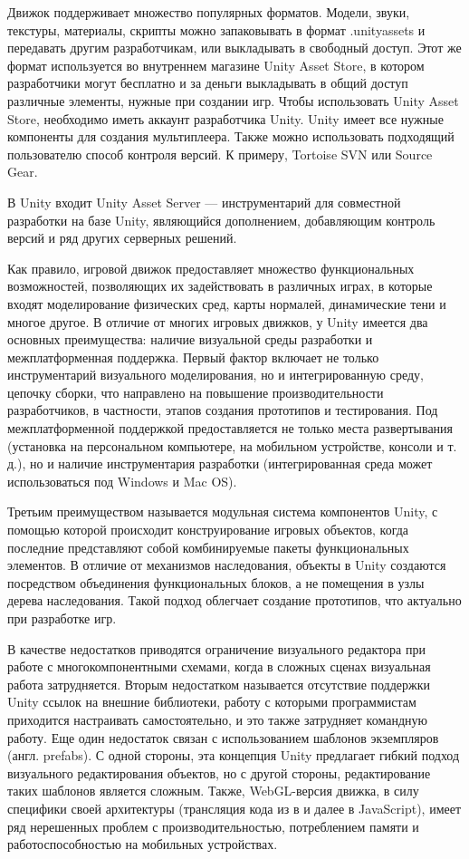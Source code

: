 Движок поддерживает множество популярных форматов. Модели, звуки, текстуры, материалы, скрипты можно запаковывать в формат .unityassets и передавать другим разработчикам, или выкладывать в свободный доступ. Этот же формат используется во внутреннем магазине Unity Asset Store, в котором разработчики могут бесплатно и за деньги выкладывать в общий доступ различные элементы, нужные при создании игр. Чтобы использовать Unity Asset Store, необходимо иметь аккаунт разработчика Unity. Unity имеет все нужные компоненты для создания мультиплеера. Также можно использовать подходящий пользователю способ контроля версий. К примеру, Tortoise SVN или Source Gear.

В Unity входит Unity Asset Server — инструментарий для совместной разработки на базе Unity, являющийся дополнением, добавляющим контроль версий и ряд других серверных решений.

Как правило, игровой движок предоставляет множество функциональных возможностей, позволяющих их задействовать в различных играх, в которые входят моделирование физических сред, карты нормалей, динамические тени и многое другое. В отличие от многих игровых движков, у Unity имеется два основных преимущества: наличие визуальной среды разработки и межплатформенная поддержка. Первый фактор включает не только инструментарий визуального моделирования, но и интегрированную среду, цепочку сборки, что направлено на повышение производительности разработчиков, в частности, этапов создания прототипов и тестирования. Под межплатформенной поддержкой предоставляется не только места развертывания (установка на персональном компьютере, на мобильном устройстве, консоли и т. д.), но и наличие инструментария разработки (интегрированная среда может использоваться под Windows и Mac OS).

Третьим преимуществом называется модульная система компонентов Unity, с помощью которой происходит конструирование игровых объектов, когда последние представляют собой комбинируемые пакеты функциональных элементов. В отличие от механизмов наследования, объекты в Unity создаются посредством объединения функциональных блоков, а не помещения в узлы дерева наследования. Такой подход облегчает создание прототипов, что актуально при разработке игр.

В качестве недостатков приводятся ограничение визуального редактора при работе с многокомпонентными схемами, когда в сложных сценах визуальная работа затрудняется. Вторым недостатком называется отсутствие поддержки Unity ссылок на внешние библиотеки, работу с которыми программистам приходится настраивать самостоятельно, и это также затрудняет командную работу. Еще один недостаток связан с использованием шаблонов экземпляров (англ. prefabs). С одной стороны, эта концепция Unity предлагает гибкий подход визуального редактирования объектов, но с другой стороны, редактирование таких шаблонов является сложным. Также, WebGL-версия движка, в силу специфики своей архитектуры (трансляция кода из \csharp в \cpp и далее в JavaScript), имеет ряд нерешенных проблем с производительностью, потреблением памяти и работоспособностью на мобильных устройствах.

